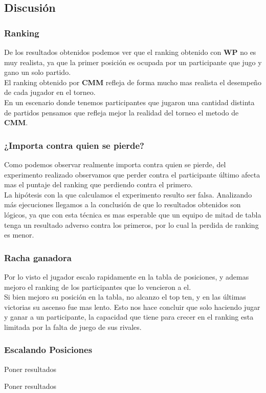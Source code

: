 \subsection{Discusión}


\subsubsection{Ranking}

De los resultados obtenidos podemos ver que el ranking obtenido con \textbf{WP} no es muy realista, ya que la primer posición es ocupada por un participante que jugo y gano un solo partido. \\

El ranking obtenido por \textbf{CMM} refleja de forma mucho mas realista el desempeño de cada jugador en el torneo. \\

En un escenario donde tenemos participantes que jugaron una cantidad distinta de partidos pensamos que refleja mejor la realidad del torneo el metodo de \textbf{CMM}. \\


\subsubsection{¿Importa contra quien se pierde?}

Como podemos observar realmente importa contra quien se pierde, del experimento realizado observamos que perder contra el participante último afecta mas el puntaje del ranking que perdiendo contra el primero. \\

La hipótesis con la que calculamos el experimento resulto ser falsa. Analizando más ejecuciones llegamos a la conclusión de que lo resultados obtenidos son lógicos, ya que con esta técnica es mas esperable que un equipo de mitad de tabla tenga un resultado adverso contra los primeros, por lo cual la perdida de ranking es menor. \\


\subsubsection{Racha ganadora}

Por lo visto el jugador escalo rapidamente en la tabla de posiciones, y ademas mejoro el ranking de los participantes que lo vencieron a el.\\

Si bien mejoro su posición en la tabla, no alcanzo el top ten, y en las últimas victorias su ascenso fue mas lento. Esto nos hace concluir que solo haciendo jugar y ganar a un participante, la capacidad que tiene para crecer en el ranking esta limitada por la falta de juego de sus rivales.



\subsubsection{Escalando Posiciones}


Poner resultados



Poner resultados
